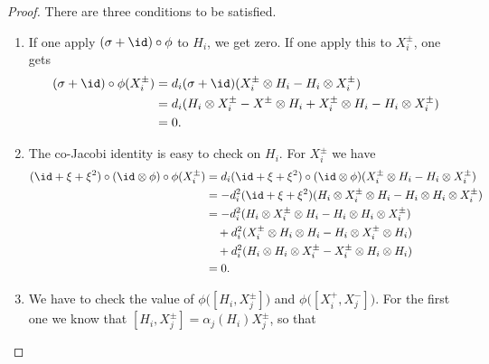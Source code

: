 \begin{proof}
	There are three conditions to be satisfied.
	\begin{enumerate}
		\item
		      If one apply \( (\sigma+\id)\circ\phi\) to \( H_i\), we get zero. If one apply this to \( X^{\pm}_i\), one gets
		      \begin{equation}
			      \begin{aligned}[]
				      (\sigma+\id)\circ\phi(X^{\pm}_i) & =d_i(\sigma+\id)(X_i^{\pm}\otimes H_i-H_i\otimes X^{\pm}_i)                                  \\
				                                       & =d_i( H_i\otimes X_i^{\pm}-X^{\pm}\otimes H_i + X_i^{\pm}\otimes H_i-H_i\otimes X^{\pm}_i  ) \\
				                                       & =0.
			      \end{aligned}
		      \end{equation}
		\item
		      The co-Jacobi identity is easy to check on \( H_i\). For \( X^{\pm}_i\) we have
		      \begin{equation}
			      \begin{aligned}[]
				      (\id+\xi+\xi^2)\circ(\id\otimes\phi)\circ\phi(X^{\pm}_i) & =d_i(\id+\xi+\xi^2)\circ(\id\otimes\phi)(X^{\pm}_i\otimes H_i-H_i\otimes X_i^{\pm})     \\
				                                                               & =-d_i^2(\id+\xi+\xi^2)(H_i\otimes X^{\pm}_i\otimes H_i-H_i\otimes H_i\otimes X^{\pm}_i) \\
				                                                               & =-d_i^2(H_i\otimes X^{\pm}_i\otimes H_i-H_i\otimes H_i\otimes X^{\pm}_i)                \\
				                                                               & \quad+d_i^2(X^{\pm}_i\otimes H_i\otimes H_i-H_i\otimes X^{\pm}_i\otimes H_i)            \\
				                                                               & \quad +d_i^2(H_i\otimes H_i\otimes X^{\pm}_i-X^{\pm}_i\otimes H_i\otimes H_i)           \\
				                                                               & =0.
			      \end{aligned}
		      \end{equation}
		\item
		      We have to check the value of \( \phi\big( [H_i,X_{j}^{\pm}] \big)\) and \( \phi\big( [X_i^+,X_j^-] \big)\). For the first one we know that \( [H_i,X_j^{\pm}]=\alpha_j(H_i)X_j^{\pm}\), so that

\end{enumerate}
\end{proof}
